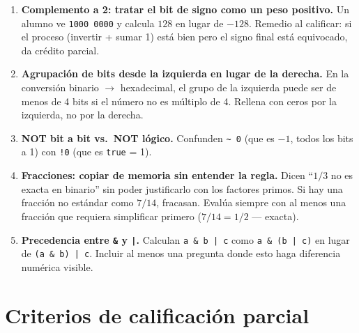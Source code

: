 \documentclass[12pt, oneside]{article}
\begin{document}
\begin{notaprofesor}
  \begin{enumerate}
    \item \textbf{Complemento a 2: tratar el bit de signo como un peso positivo.}
          Un alumno ve \texttt{1000 0000} y calcula $128$ en lugar de $-128$.
          Remedio al calificar: si el proceso (invertir + sumar 1) está bien pero el signo
          final está equivocado, da crédito parcial.

    \item \textbf{Agrupación de bits desde la izquierda en lugar de la derecha.}
          En la conversión binario $\to$ hexadecimal, el grupo de la izquierda
          puede ser de menos de 4 bits si el número no es múltiplo de 4.
          Rellena con ceros por la izquierda, no por la derecha.

    \item \textbf{NOT bit a bit vs.\ NOT lógico.}
          Confunden \texttt{\textasciitilde{} 0} (que es $-1$, todos los bits a 1)
          con \texttt{!0} (que es \texttt{true} = 1).

    \item \textbf{Fracciones: copiar de memoria sin entender la regla.}
          Dicen ``$1/3$ no es exacta en binario'' sin poder justificarlo con
          los factores primos.  Si hay una fracción no estándar como $7/14$,
          fracasan.  Evalúa siempre con al menos una fracción que requiera
          simplificar primero ($7/14 = 1/2$ — exacta).

    \item \textbf{Precedencia entre \texttt{\&} y \texttt{|}.}
          Calculan \texttt{a \& b | c} como \texttt{a \& (b | c)} en lugar
          de \texttt{(a \& b) | c}.  Incluir al menos una pregunta donde esto
          haga diferencia numérica visible.
  \end{enumerate}
\end{notaprofesor}

\section{Criterios de calificación parcial}
\end{document}
